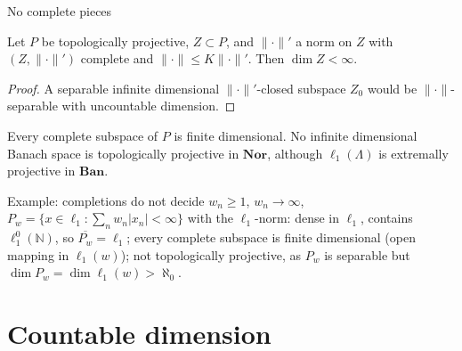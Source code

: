 \documentclass[10pt,aspectratio=169]{beamer}
\newcommand{\Nor}{\mathbf{Nor}}
\newcommand{\Ban}{\mathbf{Ban}}
\newcommand{\lo}[1]{\ell_1^0(#1)}
\newcommand{\ellone}[1]{\ell_1(#1)}
\newcommand{\NN}{\mathbb N}
\begin{document}
\begin{frame}{No complete pieces}
  \begin{corollary}
    Let $P$ be topologically projective, $Z\subset P$, and $\|\cdot\|'$ a norm on
    $Z$ with $(Z,\|\cdot\|')$ complete and $\|\cdot\|\le K\|\cdot\|'$. Then
    $\dim Z<\infty$.
  \end{corollary}
  \begin{proof}
    A separable infinite dimensional $\|\cdot\|'$-closed subspace $Z_0$ would be
    $\|\cdot\|$-separable with uncountable dimension.
  \end{proof}
  Every complete subspace of $P$ is finite dimensional. No infinite dimensional
  Banach space is topologically projective in $\Nor$, although $\ellone\Lambda$
  is extremally projective in $\Ban$.
  \begin{exampleblock}{Example: completions do not decide}
    $w_n\ge1$, $w_n\to\infty$, \
    $P_w=\{x\in\ell_1:\sum_n w_n|x_n|<\infty\}$ with the $\ell_1$-norm:
    dense in $\ell_1$, contains $\lo\NN$, so $\overline{P_w}=\ell_1$;
    every complete subspace is finite dimensional (open mapping in $\ell_1(w)$);
    \alert{not} topologically projective, as $P_w$ is separable but
    $\dim P_w=\dim\ell_1(w)>\aleph_0$.
  \end{exampleblock}
\end{frame}

\section{Countable dimension}
\end{document}
